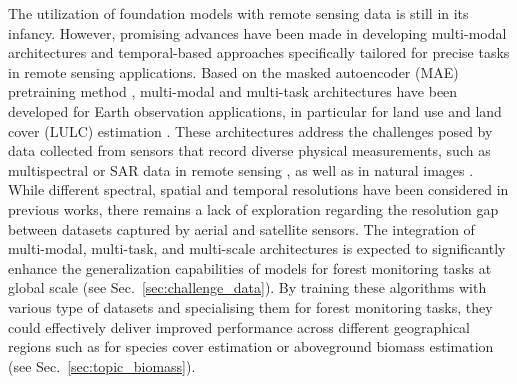 \documentclass{CUP-JNL-DTM}%
\theoremstyle{definition}
\numberwithin{equation}{section}
\begin{document}
The utilization of foundation models with remote sensing data is still in its infancy. 
However, promising advances have been made in developing multi-modal architectures \cite{zhang_mmformer_2023} and temporal-based approaches \cite{garnot_panoptic_2021, garnot_multi-modal_2021, tarasiou_vits_2023} specifically tailored for precise tasks in remote sensing applications. 
%
Based on the masked autoencoder (MAE) pretraining method \cite{he_masked_2022}, multi-modal and multi-task architectures have been developed for Earth observation applications, in particular for land use and land cover (LULC) estimation \cite{sun_ringmo_2022, cong_satmae_2022, reed_scale-mae_2022, tseng_lightweight_2023}.
%
%
These architectures address the challenges posed by data collected from sensors that record diverse physical measurements, such as multispectral or SAR data in remote sensing \cite{reed_scale-mae_2022, yamazaki_aerialformer_2023, pan_multi-scale_2023}, as well as in natural images \cite{themyr_full_2023}. While different spectral, spatial and temporal resolutions have been considered in previous works, there remains a lack of exploration regarding the resolution gap between datasets captured by aerial and satellite sensors.
%
The integration of multi-modal, multi-task, and multi-scale architectures is expected to significantly enhance the generalization capabilities of models for forest monitoring tasks at global scale (see Sec.~\ref{sec:challenge_data}). 
By training these algorithms with various type of datasets and specialising them for forest monitoring tasks, they could effectively
deliver improved performance across different geographical regions such as for species cover estimation or aboveground biomass estimation (see Sec.~\ref{sec:topic_biomass}).
%
\end{document}
